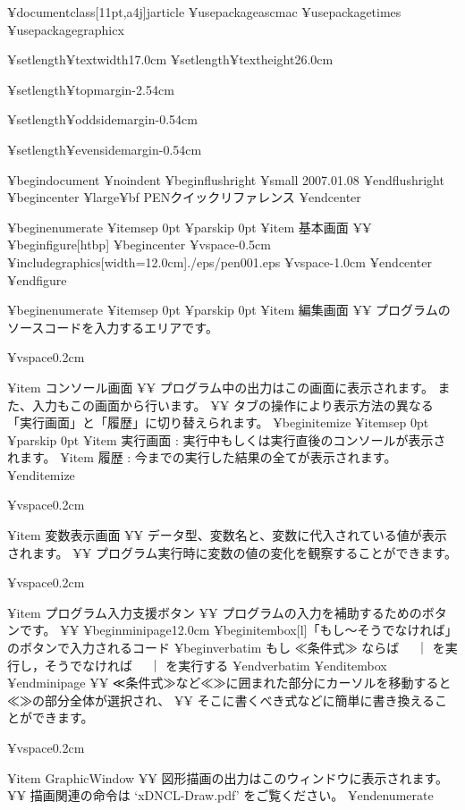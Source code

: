 ¥documentclass[11pt,a4j]{jarticle}
¥usepackage{ascmac}
¥usepackage{times}
¥usepackage{graphicx}

¥setlength¥textwidth{17.0cm}
¥setlength¥textheight{26.0cm}

¥setlength¥topmargin{-2.54cm}

¥setlength¥oddsidemargin{-0.54cm}

¥setlength¥evensidemargin{-0.54cm}

¥begin{document}
¥noindent
¥begin{flushright}
{¥small	2007.01.08}
¥end{flushright}
¥begin{center}
{¥large¥bf PENクイックリファレンス}
¥end{center}

¥begin{enumerate} ¥itemsep 0pt  ¥parskip 0pt
¥item 基本画面 ¥¥
¥begin{figure}[htbp]
  ¥begin{center}
    ¥vspace{-0.5cm}
    ¥includegraphics[width=12.0cm]{./eps/pen001.eps}
    ¥vspace{-1.0cm}
  ¥end{center}
¥end{figure}
  
¥begin{enumerate} ¥itemsep 0pt  ¥parskip 0pt
¥item 編集画面 ¥¥
プログラムのソースコードを入力するエリアです。 

¥vspace{0.2cm}

¥item コンソール画面 ¥¥
プログラム中の出力はこの画面に表示されます。
また、入力もこの画面から行います。 ¥¥
タブの操作により表示方法の異なる「実行画面」と「履歴」に切り替えられます。 
¥begin{itemize} ¥itemsep 0pt  ¥parskip 0pt
¥item 実行画面 : 実行中もしくは実行直後のコンソールが表示されます。
¥item 履歴     : 今までの実行した結果の全てが表示されます。
¥end{itemize}

¥vspace{0.2cm}

¥item 変数表示画面 ¥¥
データ型、変数名と、変数に代入されている値が表示されます。 ¥¥
プログラム実行時に変数の値の変化を観察することができます。 

¥vspace{0.2cm}

¥item プログラム入力支援ボタン ¥¥
プログラムの入力を補助するためのボタンです。 ¥¥
¥begin{minipage}{12.0cm} ¥begin{itembox}[l]{「もし〜そうでなければ」のボタンで入力されるコード} ¥begin{verbatim}
もし ≪条件式≫ ならば
 　｜
を実行し，そうでなければ
 　｜
を実行する
¥end{verbatim} ¥end{itembox} ¥end{minipage} ¥¥
≪条件式≫など≪≫に囲まれた部分にカーソルを移動すると≪≫の部分全体が選択され、 ¥¥
そこに書くべき式などに簡単に書き換えることができます。

¥vspace{0.2cm}

¥item GraphicWindow ¥¥
図形描画の出力はこのウィンドウに表示されます。 ¥¥
描画関連の命令は `xDNCL-Draw.pdf' をご覧ください。
¥end{enumerate}


